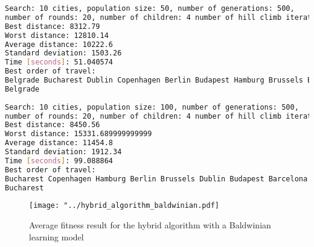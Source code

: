 \documentclass{article}
\begin{document}
\begin{lstlisting}[language=bash]
Search: 10 cities, population size: 50, number of generations: 500, 
number of rounds: 20, number of children: 4 number of hill climb iterations: 3: 
Best distance: 8312.79
Worst distance: 12810.14
Average distance: 10222.6
Standard deviation: 1503.26
Time [seconds]: 51.040574
Best order of travel: 
Belgrade Bucharest Dublin Copenhagen Berlin Budapest Hamburg Brussels Barcelona 
Belgrade
 
Search: 10 cities, population size: 100, number of generations: 500, 
number of rounds: 20, number of children: 4 number of hill climb iterations: 3: 
Best distance: 8450.56
Worst distance: 15331.689999999999
Average distance: 11454.8
Standard deviation: 1912.34
Time [seconds]: 99.088864
Best order of travel: 
Bucharest Copenhagen Hamburg Berlin Brussels Dublin Budapest Barcelona Belgrade 
Bucharest

\end{lstlisting}

\begin{figure}[H]
\begin{center}
\texttt{[image: "../hybrid\_algorithm\_baldwinian.pdf]}
\caption{Average fitness result for the hybrid algorithm with a Baldwinian learning model}
\end{center}
\end{figure}
\end{document}
